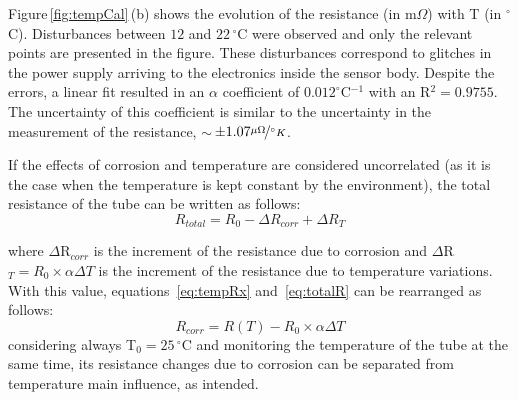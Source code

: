 \documentclass[journal,twoside,web]{ieeecolor}
\begin{document}
Figure\,\ref{fig:tempCal}\,(b) shows the evolution of the resistance (in m$\Omega$) with T (in $^{\circ}$C). Disturbances between $12$ and $22$\,$^{\circ}$C were observed and only the relevant points are presented in the figure. These disturbances correspond to glitches in the power supply arriving to the electronics inside the sensor body. Despite the errors, a linear fit resulted in an $\alpha$ coefficient of $0.012 ^{\circ}$C$^{-1}$ with an R$^{2}=0.9755$. The uncertainty of this coefficient is similar to the uncertainty in the measurement of the resistance, $\sim$\,$\pm1.07\nicefrac{\mu\Omega}{^{\circ}K}$.

If the effects of corrosion and temperature are considered uncorrelated (as it is the case when the temperature is kept constant by the environment), the total resistance of the tube can be written as follows:
\begin{equation}
\label{eq:totalR}
R_{total} = R_{0}-\Delta R_{corr}+\Delta R_{T}
\end{equation}

where $\Delta$R$_{corr}$ is the increment of the resistance due to corrosion and $\Delta$R$_{T}=R_{0}\times\alpha\Delta T$ is the increment of the resistance due to temperature variations.
With this value, equations~\ref{eq:tempRx} and~\ref{eq:totalR}  can be rearranged as follows:
\begin{equation}
\label{eq:realRx}
R_{corr} = R(T)-R_{0}\times\alpha \Delta T
\end{equation}
considering always T$_{0}=25$\,$^{\circ}$C and monitoring the temperature of the tube at the same time, its resistance changes due to corrosion can be separated from temperature main influence, as intended.
\end{document}
